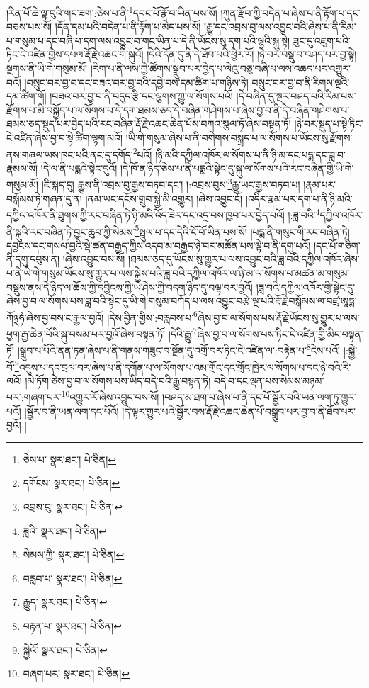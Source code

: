 །རིན་པོ་ཆེ་ལྟ་བུའི་གང་ཟག་:ཅེས་པ་ནི་\footnote{ཅེས་པ་  སྣར་ཐང་།  པེ་ཅིན། }དབང་པོ་རྣོ་བ་ཡིན་པས་སོ། །ཀུན་རྫོབ་ཀྱི་བདེན་པ་ཞེས་པ་ནི་རྟོག་པ་དང་བཅས་པས་སོ། །དོན་དམ་པའི་བདེན་པ་ནི་རྟོག་པ་མེད་པས་སོ། །རྒྱུ་དང་འབྲས་བུ་ལས་འབྱུང་བའི་ཞེས་པ་ནི་རིམ་པ་གསུམ་པ་དང་བཞི་པ་དག་ལས་འབྱུང་བ་གང་ཡིན་པ་དེ་ནི་ཡོངས་སུ་དག་པའི་ལྷའི་སྐུ་སྟེ། ཟུང་དུ་འཇུག་པའི་ཏིང་ངེ་འཛིན་གྱིས་དཔལ་རྡོ་རྗེ་འཆང་གི་སྐུའོ། །དེའི་དོན་དུ་ནི་དེ་ཐོབ་པའི་ཕྱིར་རོ། །ཉེ་བར་བསྡུ་བ་བཤད་པར་བྱ་སྟེ། སྔགས་ནི་ཡི་གེ་གསུམ་མོ། །རིག་པ་ནི་ལས་ཀྱི་ཚོགས་སྒྲུབ་པར་བྱེད་པ་ལེའུ་བཅུ་བཞི་པ་ལས་འཆད་པར་འགྱུར་བའོ། །བསྲུང་བར་བྱ་བ་དང་བཟའ་བར་བྱ་བའི་དབྱེ་བས་དམ་ཚིག་པ་གཉིས་ཏེ། བསྲུང་བར་བྱ་བ་ནི་རིགས་ལྔའི་དམ་ཚིག་གོ། །བཟའ་བར་བྱ་བ་ནི་བདུད་རྩི་དང་ལྕགས་ཀྱུ་ལ་སོགས་པའོ། །དེ་བཞིན་དུ་སྔར་བཤད་པའི་རིམ་པས་རྫོགས་པ་མི་བསྐྱོད་པ་ལ་སོགས་པ་དེ་དག་ཐམས་ཅད་དེ་བཞིན་གཤེགས་པ་ཞེས་བྱ་བ་ནི་དེ་བཞིན་གཤེགས་པ་ཐམས་ཅད་སྡུད་པར་བྱེད་པའི་རང་བཞིན་རྡོ་རྗེ་འཆང་ཆེན་པོས་བཀའ་སྩལ་ཏོ་ཞེས་བསྟན་ཏོ། །ཉེ་བར་སྡུད་པ་སྟེ་ཏིང་ངེ་འཛིན་ཞེས་བྱ་བ་སྟེ་ཚིག་ལྷག་མའོ། །ཡི་གེ་གསུམ་ཞེས་པ་ནི་བགེགས་བསྐྲད་པ་ལ་སོགས་པ་ཡོངས་སུ་རྫོགས་ནས་གཞལ་ཡས་ཁང་པའི་ནང་དུ་དགོད་\footnote{དགོངས་  སྣར་ཐང་།  པེ་ཅིན། }པའོ། །ཉི་མའི་དཀྱིལ་འཁོར་ལ་སོགས་པ་ནི་ཉི་མ་དང་པདྨ་དང་ཟླ་བ་རྣམས་སོ། །དེ་ལ་ནི་པདྨའི་སྟེང་དུའོ། །དེ་ཁོ་ན་ཉིད་ཅེས་པ་ནི་པདྨའི་སྟེང་དུ་སྐུ་ལ་སོགས་པའི་རང་བཞིན་གྱི་ཡི་གེ་གསུམ་མོ། །ཇི་སྐད་དུ། རྒྱུས་ནི་འབྲས་བུ་རྒྱས་བཏབ་དང་། །:འབྲས་བུས་\footnote{འབྲས་བུ་  སྣར་ཐང་།  པེ་ཅིན། }རྒྱུ་ཡང་རྒྱས་བཏབ་པ། །རྣམ་པར་བསྒོམས་ཏེ་གཞན་དུ་ན། །ནམ་ཡང་དངོས་གྲུབ་སྐྱེ་མི་འགྱུར། །ཞེས་འབྱུང་ངོ། །འདིར་རྣམ་པར་དག་པ་ནི་ཉི་མའི་དཀྱིལ་འཁོར་ནི་ཐུགས་ཀྱི་རང་བཞིན་ཏེ་ཉི་མའི་འོད་ཟེར་དང་འདྲ་བས་ཁྱབ་པར་བྱེད་པའོ། །:ཟླ་བའི་\footnote{ཟླའི་  སྣར་ཐང་།  པེ་ཅིན། }དཀྱིལ་འཁོར་ནི་སྐུའི་རང་བཞིན་ཏེ་བྱང་ཆུབ་ཀྱི་སེམས་\footnote{སེམས་ཀྱི་  སྣར་ཐང་།  པེ་ཅིན། }སྤྲུལ་པ་དང་དེའི་ངོ་བོ་ཡིན་པས་སོ། །པདྨ་ནི་གསུང་གི་རང་བཞིན་ཏེ། དབྱངས་དང་གསལ་བྱའི་སྡེ་ཚན་བརྒྱད་ཀྱིས་འདབ་མ་བརྒྱད་ཉེ་བར་མཚོན་པས་ལྟེ་བ་ནི་དགུ་པའོ། །དང་པོ་གཅིག་ནི་དགུ་དབུས་ན། །ཞེས་འབྱུང་བས་སོ། །ཐམས་ཅད་དུ་ཡོངས་སུ་གྱུར་པ་ལས་འབྱུང་བའི་ཟླ་བའི་དཀྱིལ་འཁོར་ཞེས་པ་ནི་ཡི་གེ་གསུམ་ཡོངས་སུ་གྱུར་པ་ལས་སྐྱེས་པའི་ཟླ་བའི་དཀྱིལ་འཁོར་ལ་ཉི་མ་ལ་སོགས་པ་མཚན་མ་གསུམ་བསྡུས་ནས་དེ་ཉིད་ལ་ཆོས་ཀྱི་དབྱིངས་ཀྱི་ཡེ་ཤེས་ཀྱི་བདག་ཉིད་དུ་བལྟ་བར་བྱའོ། །ཟླ་བའི་དཀྱིལ་འཁོར་གྱི་སྟེང་དུ་ཞེས་བྱ་བ་ལ་སོགས་པས་ཟླ་བའི་སྟེང་དུ་ཡི་གེ་གསུམ་བཀོད་པ་ལས་འབྱུང་བརྩེ་ལྔ་པའི་རྡོ་རྗེ་བསྒོམས་ལ་བཛྲ་ཨཱཏྨ་ཀོ྅ཧཾ་ཞེས་བྱ་བས་ང་རྒྱལ་བྱའོ། །དེས་བྱིན་གྱིས་:བརླབས་པ་\footnote{བརླབ་པ་  སྣར་ཐང་།  པེ་ཅིན། }ཞེས་བྱ་བ་ལ་སོགས་པས་རྡོ་རྗེ་ཡོངས་སུ་གྱུར་པ་ལས་ཕྱག་རྒྱ་ཆེན་པོའི་སྐུ་བསམ་པར་བྱའོ་ཞེས་བསྟན་ཏོ། །དེའི་རྒྱུ་\footnote{རྒྱུད་  སྣར་ཐང་།  པེ་ཅིན། }ཞེས་བྱ་བ་ལ་སོགས་པས་ཏིང་ངེ་འཛིན་གྱི་མིང་བསྟན་ཏོ། །སྒྲུབ་པ་པོའི་ནན་ཏན་ཞེས་པ་ནི་གནས་གཟུང་བ་སྔོན་དུ་འགྲོ་བར་ཏིང་ངེ་འཛིན་ལ་:བརྟེན་པ་\footnote{བརྟན་པ་  སྣར་ཐང་།  པེ་ཅིན། }ངེས་པའོ། །:སྐྱེ་བོ་\footnote{སྐྱེའོ་  སྣར་ཐང་།  པེ་ཅིན། }འདུས་པ་དང་བྲལ་བར་ཞེས་པ་ནི་དགོན་པ་ལ་སོགས་པ་འམ་གྲོང་དང་གྲོང་ཁྱེར་ལ་སོགས་པ་དང་ཉེ་བའི་རི་ལའོ། །མེ་ཏོག་ཅེས་བྱ་བ་ལ་སོགས་པས་ཡིད་བདེ་བའི་རྒྱུ་བསྟན་ཏེ། བདེ་བ་དང་ལྡན་པས་སེམས་མཉམ་པར་:གཞག་པར་\footnote{བཞག་པར་  སྣར་ཐང་།  པེ་ཅིན། }འགྱུར་རོ་ཞེས་འབྱུང་བས་སོ། །བཤད་མ་ཐག་པ་ཞེས་པ་ནི་དང་པོ་སྦྱོར་བའི་ཡན་ལག་ཏུ་གྱུར་པའོ། །སྦྱོར་བ་ནི་ཡན་ལག་དང་པོའོ། །དེ་ལྟར་གྱུར་པའི་སྦྱོར་བས་རྡོ་རྗེ་འཆང་ཆེན་པོ་བསྒྲུབ་པར་བྱ་བ་ནི་ཐོབ་པར་བྱའོ། །

